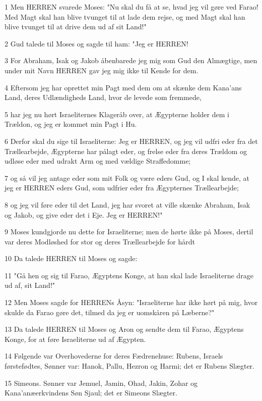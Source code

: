 \par 1 Men HERREN svarede Moses: "Nu skal du få at se, hvad jeg vil gøre ved Farao! Med Magt skal han blive tvunget til at lade dem rejse, og med Magt skal han blive tvunget til at drive dem ud af sit Land!"
\par 2 Gud talede til Moses og sagde til ham: "Jeg er HERREN!
\par 3 For Abraham, Isak og Jakob åbenbarede jeg mig som Gud den Almægtige, men under mit Navn HERREN gav jeg mig ikke til Kende for dem.
\par 4 Eftersom jeg har oprettet min Pagt med dem om at skænke dem Kana'ans Land, deres Udlændigheds Land, hvor de levede som fremmede,
\par 5 har jeg nu hørt Israeliternes Klageråb over, at Ægypterne holder dem i Trældon, og jeg er kommet min Pagt i Hu.
\par 6 Derfor skal du sige til Israeliterne: Jeg er HERREN, og jeg vil udfri eder fra det Trællearbejde, Ægypterne har pålagt eder, og frelse eder fra deres Trældom og udløse eder med udrakt Arm og med vældige Straffedomme;
\par 7 og så vil jeg antage eder som mit Folk og være eders Gud, og I skal kende, at jeg er HERREN eders Gud, som udfrier eder fra Ægypternes Trællearbejde;
\par 8 og jeg vil føre eder til det Land, jeg har svoret at ville skænke Abraham, Isak og Jakob, og give eder det i Eje. Jeg er HERREN!"
\par 9 Moses kundgjorde nu dette for Israeliterne; men de hørte ikke på Moses, dertil var deres Modløshed for stor og deres Trællearbejde for hårdt
\par 10 Da talede HERREN til Moses og sagde:
\par 11 "Gå hen og sig til Farao, Ægyptens Konge, at han skal lade Israeliterne drage ud af, sit Land!"
\par 12 Men Moses sagde for HERRENs Åsyn: "Israeliterne har ikke hørt på mig, hvor skulde da Farao gøre det, tilmed da jeg er uomskåren på Læberne?"
\par 13 Da talede HERREN til Moses og Aron og sendte dem til Farao, Ægyptens Konge, for at føre Israeliterne ud af Ægypten.
\par 14 Følgende var Overhovederne for deres Fædrenehuse: Rubens, Israels førstefødtes, Sønner var: Hanok, Pallu, Hezron og Harmi; det er Rubens Slægter.
\par 15 Simeons. Sønner var Jemuel, Jamin, Ohad, Jakin, Zohar og Kana'anæerkvindens Søn Sjaul; det er Simeons Slægter.
